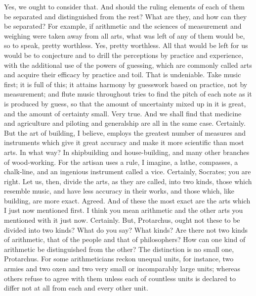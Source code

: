 \documentclass[letterpaper,12pt]{article}
\newcommand{\stephpag}[1]{\marginnote{\small\itshape\fontfamily{ppl}\selectfont #1}}
\begin{document}
\begin{drama}
Yes, we ought to consider that.
\socratesspeaks
And should the ruling elements of each of them be separated and distinguished from the rest?
\protarchusspeaks
What are they, and how can they be separated? \stephpag{e}
\socratesspeaks
For example, if arithmetic and the sciences of measurement and weighing were taken away from all arts, what was left of any of them would be, so to speak, pretty worthless.
\protarchusspeaks
Yes, pretty worthless.
\socratesspeaks
All that would be left for us would be to conjecture and to drill the perceptions by practice and experience, with the additional use of the powers of guessing, \stephpag{56 a} which are commonly called arts and acquire their efficacy by practice and toil.
\protarchusspeaks
That is undeniable.
\socratesspeaks
Take music first; it is full of this; it attains harmony by guesswork based on practice, not by measurement; and flute music throughout tries to find the pitch of each note as it is produced by guess, so that the amount of uncertainty mixed up in it is great, and the amount of certainty small.
\protarchusspeaks
Very true. \stephpag{b}
\socratesspeaks
And we shall find that medicine and agriculture and piloting and generalship are all in the same case.
\protarchusspeaks
Certainly.
\socratesspeaks
But the art of building, I believe, employs the greatest number of measures and instruments which give it great accuracy and make it more scientific than most arts.
\protarchusspeaks
In what way?
\socratesspeaks
In shipbuilding and house-building, and many other branches of wood-working. For the artisan uses a rule, I imagine, a lathe, compasses, a chalk-line, \stephpag{c} and an ingenious instrument called a vice.
\protarchusspeaks
Certainly, Socrates; you are right.
\socratesspeaks
Let us, then, divide the arts, as they are called, into two kinds, those which resemble music, and have less accuracy in their works, and those which, like building, are more exact.
\protarchusspeaks
Agreed.
\socratesspeaks
And of these the most exact are the arts which I just now mentioned first.
\protarchusspeaks
I think you mean arithmetic and the other arts you mentioned with it just now. \stephpag{d}
\socratesspeaks
Certainly. But, Protarchus, ought not these to be divided into two kinds? What do you say?
\protarchusspeaks
What kinds?
\socratesspeaks
Are there not two kinds of arithmetic, that of the people and that of philosophers?
\protarchusspeaks
How can one kind of arithmetic be distinguished from the other?
\socratesspeaks
The distinction is no small one, Protarchus. For some arithmeticians reckon unequal units, \stephpag{e} for instance, two armies and two oxen and two very small or incomparably large units; whereas others refuse to agree with them unless each of countless units is declared to differ not at all from each and every other unit.

\end{drama}
\end{document}
